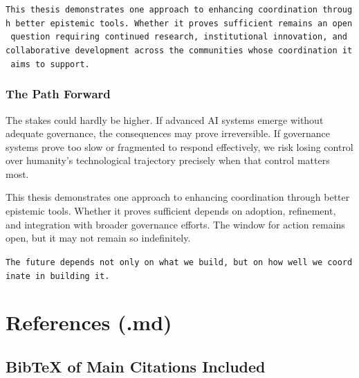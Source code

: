 \documentclass[
  11pt,
  letterpaper,
]{book}
\begin{document}
\texttt{This\ thesis\ demonstrates\ one\ approach\ to\ enhancing\ coordination\ through\ better\ epistemic\ tools.\ Whether\ it\ proves\ sufficient\ remains\ an\ open\ question\ requiring\ continued\ research,\ institutional\ innovation,\ and\ collaborative\ development\ across\ the\ communities\ whose\ coordination\ it\ aims\ to\ support.}

\subsection{The Path Forward}\label{sec-path-forward}

The stakes could hardly be higher. If advanced AI systems emerge without
adequate governance, the consequences may prove irreversible. If
governance systems prove too slow or fragmented to respond effectively,
we risk losing control over humanity's technological trajectory
precisely when that control matters most.

This thesis demonstrates one approach to enhancing coordination through
better epistemic tools. Whether it proves sufficient depends on
adoption, refinement, and integration with broader governance efforts.
The window for action remains open, but it may not remain so
indefinitely.

\texttt{The\ future\ depends\ not\ only\ on\ what\ we\ build,\ but\ on\ how\ well\ we\ coordinate\ in\ building\ it.}


\chapter{References (.md)}\label{references-.md}

\section{BibTeX of Main Citations
Included}\label{bibtex-of-main-citations-included}
\end{document}
